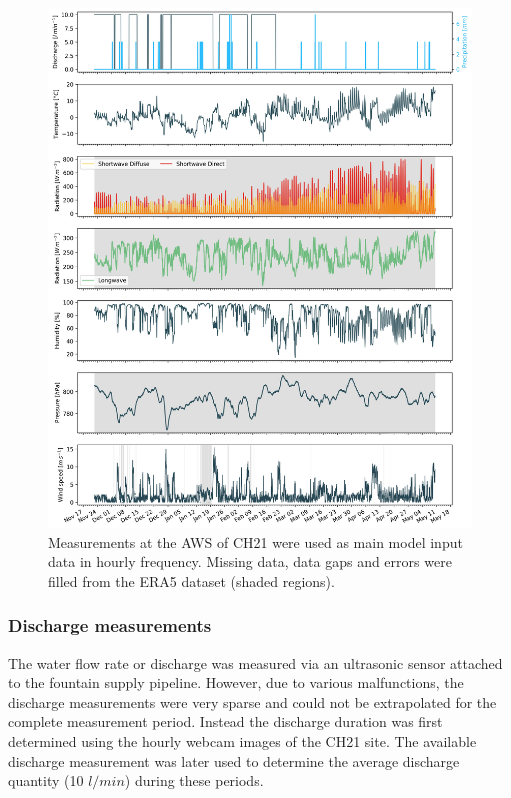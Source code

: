 \documentclass[utf8]{frontiersSCNS} %
\begin{document}
\begin{figure} 
    \centering 
    \includegraphics[width=\linewidth]{./Figures/Model_Input_Manual.jpg} 
\caption{Measurements at the AWS of CH21 were used as main model input data in hourly frequency. Missing data, data gaps
and errors were filled from the ERA5 dataset (shaded regions).} 
    \label{fig:input} 
\end{figure}

\subsubsection{Discharge measurements} The water flow rate or discharge was measured via an ultrasonic sensor attached
to the fountain supply pipeline.  However, due to various malfunctions, the discharge measurements were very sparse and
could not be extrapolated for the complete measurement period.  Instead the discharge duration was first determined
using the hourly webcam images of the CH21 site. The available discharge measurement was later used to determine the
average discharge quantity (10 $l/min$) during these periods. 
\end{document}
